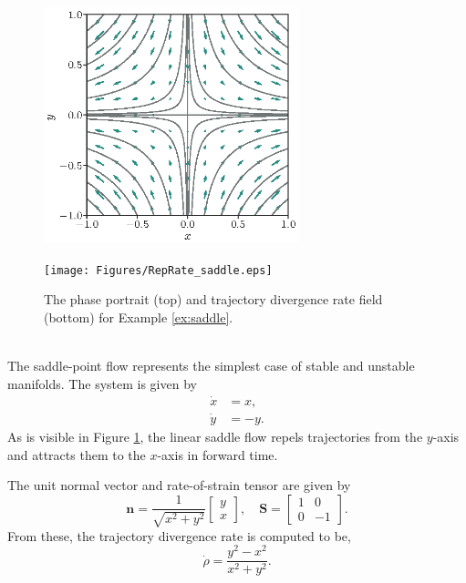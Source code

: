 \documentclass[twocolumn]{svjour3}
\begin{document}
\begin{figure}
\centering
\begin{minipage}{0.45\textwidth}
\centering
\includegraphics[height=2.7in]{Figures/PhasePlot_saddle.eps}
\end{minipage}
\begin{minipage}{0.45\textwidth}
\centering
\texttt{[image: Figures/RepRate\_saddle.eps]}
\end{minipage}
\caption{The phase portrait (top) and trajectory divergence rate field (bottom) for Example \ref{ex:saddle}.}
\label{fig:saddle}
\end{figure}

 \\
The saddle-point flow represents the simplest case of stable and unstable manifolds. The system is given by
\begin{equation}
\begin{aligned}
\dot{x} & = x, \\
\dot{y} & = -y.
\end{aligned}
\end{equation}
As is visible in Figure \ref{fig:saddle}, the linear saddle flow repels trajectories from the $y$-axis and attracts them to the $x$-axis in forward time.

The unit normal vector and rate-of-strain tensor are given by 
\begin{equation}
\mathbf{n} = \frac{1}{\sqrt{x^2+y^2}}\left[\begin{array}{c}
y \\
x
\end{array}\right], \quad
\mathbf{S} = \left[\begin{array}{cc}
1 & 0 \\
0 & -1
\end{array}\right].
\end{equation}
From these, the trajectory divergence rate is computed to be,
\begin{equation}
\dot{\rho} = \frac{y^2-x^2}{x^2+y^2}.
\label{eq:SaddleDivRate}
\end{equation}
\end{document}

